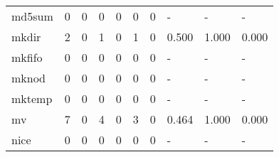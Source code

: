 \begin{longtable}{lp{2.0cm}p{2.0cm}p{2.0cm}p{2.0cm}p{2.0cm}p{2.0cm}p{2.0cm}p{2.0cm}p{2.0cm}}
md5sum    &                      0 &                                  0 &                                 0 &                                0 &                                 0 &                               0 &                                    - &                                      - &                                    - \\
mkdir     &                      2 &                                  0 &                                 1 &                                0 &                                 1 &                               0 &                                0.500 &                                  1.000 &                                0.000 \\
mkfifo    &                      0 &                                  0 &                                 0 &                                0 &                                 0 &                               0 &                                    - &                                      - &                                    - \\
mknod     &                      0 &                                  0 &                                 0 &                                0 &                                 0 &                               0 &                                    - &                                      - &                                    - \\
mktemp    &                      0 &                                  0 &                                 0 &                                0 &                                 0 &                               0 &                                    - &                                      - &                                    - \\
mv        &                      7 &                                  0 &                                 4 &                                0 &                                 3 &                               0 &                                0.464 &                                  1.000 &                                0.000 \\
nice      &                      0 &                                  0 &                                 0 &                                0 &                                 0 &                               0 &                                    - &                                      - &                                    - \\

\end{longtable}
